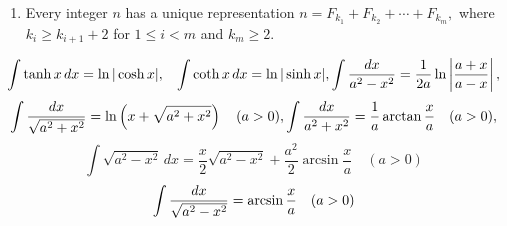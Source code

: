 \documentclass[12pt]{extarticle}
\begin{document}
\begin{multicols*}{2}
\begin{enumerate}
		\item Every integer $n$ has a unique representation
		$ n = F_{k_1} + F_{k_2} + \cdots + F_{k_m},$
		where $k_i \geq k_{i+1} + 2$ for $1 \leq i < m$ and $k_m \geq 2$.
		\end{enumerate}
	
	$$\int \tanh x \, dx = \ln \vert \cosh x \vert, \hspace{3mm}
	\int \coth x \, dx = \ln \vert \sinh x \vert, \int {dx  \over a^2 - x^2} = {1 \over 2a} \ln\left\vert{a + x \over a - x}\right\vert, $$
	$$ \int {dx  \over \sqrt{a^2 + x^2}}= \ln \left(x + \sqrt{a^2 + x^2}\right) \quad (a > 0), \int {dx  \over a^2 + x^2}= \frac 1 a \arctan \frac x a \quad (a > 0), $$
	$$ \int \sqrt{a^2 - x^2} \, dx = \frac x 2 \sqrt{a^2 - x^2} + \frac{a^2}{2} \arcsin \frac x a \quad (a > 0) $$ $$\int {dx  \over \sqrt{a^2 - x^2}} = \arcsin \frac x a \quad (a > 0) $$
	
		\end{multicols*}
\end{document}
